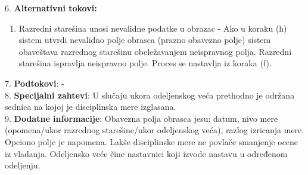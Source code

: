 \documentclass{article}
\begin{document}
6. \textbf{Alternativni tokovi:}
\begin{enumerate} [label=(\roman*)]
\item Razredni starešina unosi nevalidne podatke u obrazac - Ako u koraku (h) sistem utvrdi nevalidno polje obrasca (prazno obavezno polje) sistem obaveštava razrednog starešinu obeležavanjem neispravnog polja. Razredni starešina ispravlja neispravno polje. Proces se nastavlja iz koraka (f).
\end{enumerate}

7. \textbf{Podtokovi}: - \\

8. \textbf{Specijalni zahtevi}: U slučaju ukora odeljenskog veća prethodno je održana sednica na kojoj je disciplinska mere izglasana. \\

9. \textbf{Dodatne informacije}: Obavezna polja obrasca jesu: datum, nivo mere (opomena/ukor razrednog starešine/ukor odeljenskog veća), razlog izricanja mere. Opciono polje je napomena. Lakše disciplinske mere ne povlače smanjenje ocene iz vladanja. Odeljensko veće čine nastavnici koji izvode nastavu u određenom odeljenju. \\
\end{document}
